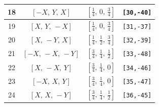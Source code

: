 \documentclass[fleqn,8pt]{jsarticle}
\begin{document}
\begin{longtable}{cccc}
18 & $\left[ - X,\, Y,\, X \right]$ & $\left[ \frac{1}{4},\, 0,\, \frac{3}{4} \right]$ & {\tt [30,-40]} \\ \hline
19 & $\left[ X,\, Y,\, - X \right]$ & $\left[ \frac{1}{4},\, 0,\, \frac{3}{4} \right]$ & {\tt [31,-37]} \\ \hline
20 & $\left[ X,\, - Y,\, X \right]$ & $\left[ \frac{1}{4},\, \frac{1}{2},\, \frac{3}{4} \right]$ & {\tt [32,-39]} \\ \hline
21 & $\left[ - X,\, - X,\, - Y \right]$ & $\left[ \frac{3}{4},\, \frac{1}{4},\, \frac{1}{2} \right]$ & {\tt [33,-48]} \\ \hline
22 & $\left[ X,\, - X,\, Y \right]$ & $\left[ \frac{3}{4},\, \frac{1}{4},\, 0 \right]$ & {\tt [34,-46]} \\ \hline
23 & $\left[ - X,\, X,\, Y \right]$ & $\left[ \frac{3}{4},\, \frac{1}{4},\, 0 \right]$ & {\tt [35,-47]} \\ \hline
24 & $\left[ X,\, X,\, - Y \right]$ & $\left[ \frac{3}{4},\, \frac{1}{4},\, \frac{1}{2} \right]$ & {\tt [36,-45]} \\
\end{longtable}
\renewcommand{\arraystretch}{1.2}
\end{document}
